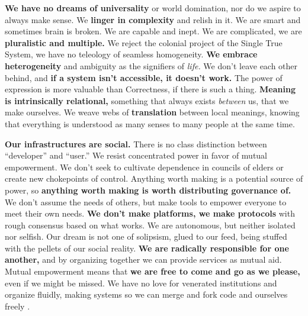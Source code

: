 \textbf{We have no dreams of universality} or world domination, nor do
we aspire to always make sense. We \textbf{linger in complexity} and
relish in it. We are smart and sometimes brain is broken. We are capable
and inept. We are complicated, we are \textbf{pluralistic and multiple.}
We reject the colonial project of the Single True System, we have no
teleology of seamless homogeneity. \textbf{We embrace heterogeneity} and
ambiguity as the signifiers of \emph{life.} We don't leave each other
behind, and \textbf{if a system isn't accessible, it doesn't work.} The
power of expression is more valuable than Correctness, if there is such
a thing. \textbf{Meaning is intrinsically relational,} something that
always exists \emph{between} us, that we make ourselves. We weave webs
of \textbf{translation} between local meanings, knowing that everything
is understood as many senses to many people at the same time.

\textbf{Our infrastructures are social.} There is no class distinction
between ``developer'' and ``user.'' We resist concentrated power in
favor of mutual empowerment. We don't seek to cultivate dependence in
councils of elders or create new chokepoints of control. Anything worth
making is a potential source of power, so \textbf{anything worth making
is worth distributing governance of.} We don't assume the needs of
others, but make tools to empower everyone to meet their own needs.
\textbf{We don't make platforms, we make protocols} with rough consensus
based on what works. We are autonomous, but neither isolated nor
selfish. Our dream is not one of solipsism, glued to our feed, being
stuffed with the pellets of our social reality. \textbf{We are radically
responsible for one another,} and by organizing together we can provide
services as mutual aid. Mutual empowerment means that \textbf{we are
free to come and go as we please,} even if we might be missed. We have
no love for venerated institutions and organize fluidly, making systems
so we can merge and fork code and
ourselves freely \cite{bookchinNoteAffinityGroups1969, MeatballWikiRightToFork} .

